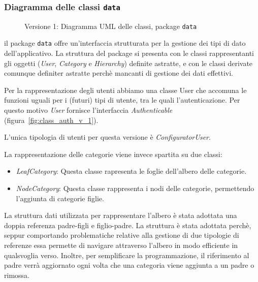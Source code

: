 \subsubsection{Diagramma delle classi \texttt{data}}
\vspace{0.5cm}
\begin{figure}[H]
    \centering
    \caption{Versione 1: Diagramma UML delle classi, package \texttt{data}}
    \label{fig:class_data_v_1}
\end{figure}

il package \texttt{data} offre un'interfaccia strutturata per la gestione dei tipi di dato dell'applicativo.
La struttura del package si presenta con le classi rappresentanti gli oggetti (\textit{User}, \textit{Category} e \textit{Hierarchy})
definite astratte, e con le classi derivate comunque definiter astratte perchè mancanti di gestione dei dati effettivi.

Per la rappresentazione degli utenti abbiamo una classe User che accomuna le funzioni uguali per i (futuri) tipi di utente, tra le quali
l'autenticazione. Per questo motivo \textit{User} fornisce l'interfaccia \textit{Authenticable} (figura~\ref{fig:class_auth_v_1}).

L'unica tipologia di utenti per questa versione è \textit{ConfiguratorUser}.

La rappresentazione delle categorie viene invece spartita su due classi:
\begin{itemize}
    \item \textit{LeafCategory}: Questa classe rapresenta le foglie dell'albero delle categorie.
    \item \textit{NodeCategory}: Questa classe rappresenta i nodi delle categorie, permettendo l'aggiunta di categorie figlie.
\end{itemize}

La struttura dati utilizzata per rappresentare l'albero è stata adottata una doppia referenza padre-figli e figlio-padre.
La struttura è stata adottata perchè, seppur comportando problematiche relative alla gestione di due tipologie di referenze
essa permette di navigare attraverso l'albero in modo efficiente in qualsvoglia verso.
Inoltre, per semplificare la programmazione, il riferimento al padre verrà aggiornato ogni volta che una categoria viene
aggiunta a un padre o rimossa.